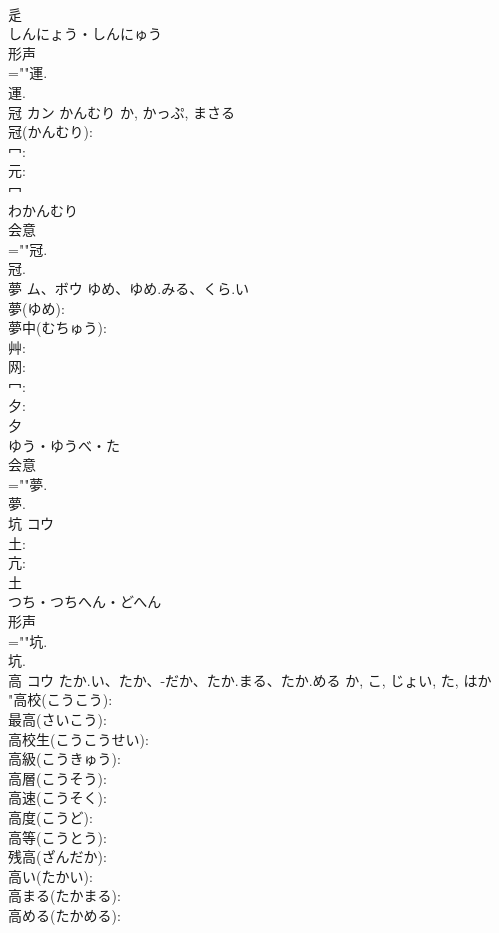 \documentclass[8pt]{extreport}
\begin{document}
\begin{CJK}{UTF8}{min}
\\	辵	
\\	しんにょう・しんにゅう	
\\	形声 
\\	=""運.
\\	運.
\\	冠	カン	かんむり	か, かっぷ, まさる	
\\	冠(かんむり): 
\\	冖: 
\\	元: 
\\	冖	
\\	わかんむり	
\\	会意 
\\	=""冠.
\\	冠.
\\	夢	ム、ボウ	ゆめ、ゆめ.みる、くら.い		
\\	夢(ゆめ): 
\\	夢中(むちゅう): 
\\	艸: 
\\	网: 
\\	冖: 
\\	夕: 
\\	夕	
\\	ゆう・ゆうべ・た	
\\	会意 
\\	=""夢.
\\	夢.
\\	坑	コウ			
\\	土: 
\\	亢: 
\\	土	
\\	つち・つちへん・どへん	
\\	形声 
\\	=""坑.
\\	坑.
\\	高	コウ	たか.い、たか、-だか、たか.まる、たか.める	か, こ, じょい, た, はか	
\\	"高校(こうこう): 
\\	最高(さいこう): 
\\	高校生(こうこうせい): 
\\	高級(こうきゅう): 
\\	高層(こうそう): 
\\	高速(こうそく): 
\\	高度(こうど): 
\\	高等(こうとう): 
\\	残高(ざんだか): 
\\	高い(たかい): 
\\	高まる(たかまる): 
\\	高める(たかめる): 

\end{CJK}
\end{document}
